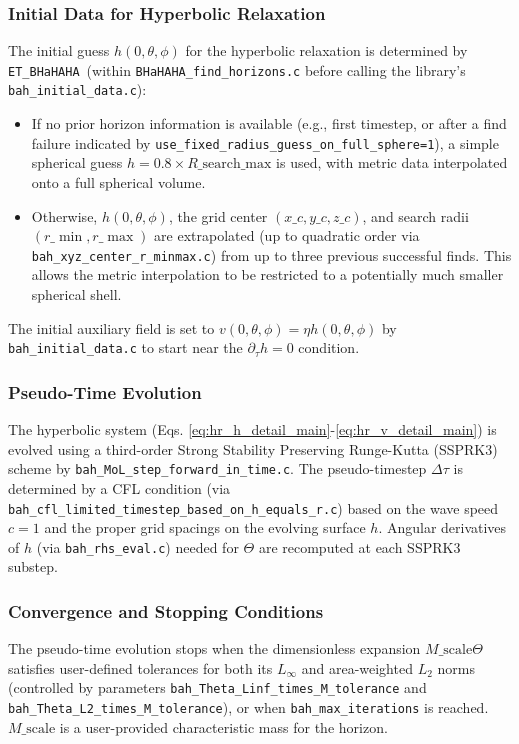 \documentclass[a4paper,11pt]{article}
\newcommand{\thorn}[1]{{\tt #1}}
\newcommand{\BHaHAHA}{\thorn{ET\_BHaHAHA}} %
\begin{document}
\subsubsection{Initial Data for Hyperbolic Relaxation}
The initial guess $h(0, \theta, \phi)$ for the hyperbolic relaxation is determined by \BHaHAHA\ (within \texttt{BHaHAHA\_find\_horizons.c} before calling the library's \texttt{bah\_initial\_data.c}):
\begin{itemize}
    \item If no prior horizon information is available (e.g., first timestep, or after a find failure indicated by \texttt{use\_fixed\_radius\_guess\_on\_full\_sphere=1}), a simple spherical guess $h = 0.8 \times R\_{\text{search\_max}}$ is used, with metric data interpolated onto a full spherical volume.
    \item Otherwise, $h(0, \theta, \phi)$, the grid center $(x\_c, y\_c, z\_c)$, and search radii $(r\_{\min}, r\_{\max})$ are extrapolated (up to quadratic order via \texttt{bah\_xyz\_center\_r\_minmax.c}) from up to three previous successful finds. This allows the metric interpolation to be restricted to a potentially much smaller spherical shell.
\end{itemize}
The initial auxiliary field is set to $v(0, \theta, \phi) = \eta h(0, \theta, \phi)$ by \texttt{bah\_initial\_data.c} to start near the $\partial_\tau h = 0$ condition.

\subsubsection{Pseudo-Time Evolution}
The hyperbolic system (Eqs. \ref{eq:hr_h_detail_main}-\ref{eq:hr_v_detail_main}) is evolved using a third-order Strong Stability Preserving Runge-Kutta (SSPRK3) scheme \cite{Gottlieb2001} by \texttt{bah\_MoL\_step\_forward\_in\_time.c}. The pseudo-timestep $\Delta \tau$ is determined by a CFL condition (via \texttt{bah\_cfl\_limited\_timestep\_based\_on\_h\_equals\_r.c}) based on the wave speed $c=1$ and the proper grid spacings on the evolving surface $h$. Angular derivatives of $h$ (via \texttt{bah\_rhs\_eval.c}) needed for $\Theta$ are recomputed at each SSPRK3 substep.

\subsubsection{Convergence and Stopping Conditions}
The pseudo-time evolution stops when the dimensionless expansion $M\_{\text{scale}}\Theta$ satisfies user-defined tolerances for both its $L_\infty$ and area-weighted $L_2$ norms (controlled by parameters \texttt{bah\_Theta\_Linf\_times\_M\_tolerance} and \texttt{bah\_Theta\_L2\_times\_M\_tolerance}), or when \texttt{bah\_max\_iterations} is reached. $M\_{\text{scale}}$ is a user-provided characteristic mass for the horizon.
\end{document}
